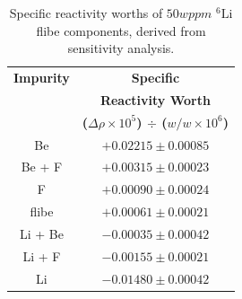 \documentclass[11pt]{article}
\newcommand{\E}[1]{\times10^{#1}}
\newcommand{\iso}[2]{$^{#2}\mathrm{#1}$}
\begin{document}
\clearpage
\begin{table}[ht]\footnotesize
    \centering
    \caption{Specific reactivity worths of $50wppm$ \iso{Li}{6} flibe components, derived from sensitivity analysis.}
    \label{tab:flibeWorths}
    \begin{tabular}{| c | c |} \hline
    \textbf{Impurity} & \textbf{Specific} \\
                      & \textbf{Reactivity Worth} \\
                      & \textbf{($\Delta\rho \E{5}$) $\div$ ($w/w \E{6}$)} \\ \hline
    Be                & $+0.02215\pm0.00085$ \\ \hline
    Be + F            & $+0.00315\pm0.00023$ \\ \hline
    F                 & $+0.00090\pm0.00024$ \\ \hline
    flibe             & $+0.00061\pm0.00021$ \\ \hline
    Li + Be           & $-0.00035\pm0.00042$ \\ \hline
    Li + F            & $-0.00155\pm0.00021$ \\ \hline
    Li                & $-0.01480\pm0.00042$ \\ \hline
    \end{tabular}
\end{table}
\end{document}
